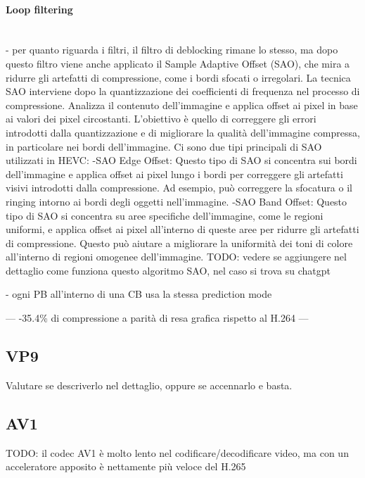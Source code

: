 \documentclass[a4paper,12pt, oneside]{article}
\begin{document}
\paragraph{Loop filtering}\hphantom{A}\\
- per quanto riguarda i filtri, il filtro di deblocking rimane lo stesso, ma dopo questo filtro viene anche applicato il Sample Adaptive Offset (SAO), che mira a ridurre gli artefatti di compressione, come i bordi sfocati o irregolari.
La tecnica SAO interviene dopo la quantizzazione dei coefficienti di frequenza nel processo di compressione. Analizza il contenuto dell'immagine e applica offset ai pixel in base ai valori dei pixel circostanti. L'obiettivo è quello di correggere gli errori introdotti dalla quantizzazione e di migliorare la qualità dell'immagine compressa, in particolare nei bordi dell'immagine.
Ci sono due tipi principali di SAO utilizzati in HEVC:
        -SAO Edge Offset: Questo tipo di SAO si concentra sui bordi dell'immagine e applica offset ai pixel lungo i bordi per correggere gli artefatti visivi introdotti dalla compressione. Ad esempio, può correggere la sfocatura o il ringing intorno ai bordi degli oggetti nell'immagine.
        -SAO Band Offset: Questo tipo di SAO si concentra su aree specifiche dell'immagine, come le regioni uniformi, e applica offset ai pixel all'interno di queste aree per ridurre gli artefatti di compressione. Questo può aiutare a migliorare la uniformità dei toni di colore all'interno di regioni omogenee dell'immagine.
TODO: vedere se aggiungere nel dettaglio come funziona questo algoritmo SAO, nel caso si trova su chatgpt

- ogni PB all'interno di una CB usa la stessa prediction mode



---
-35.4\% di compressione a parità di resa grafica rispetto al H.264
---

\subsection{VP9}    %
Valutare se descriverlo nel dettaglio, oppure se accennarlo e basta.

\subsection{AV1}
TODO: il codec AV1 è molto lento nel codificare/decodificare video, ma con un acceleratore apposito è nettamente più veloce del H.265
\end{document}
